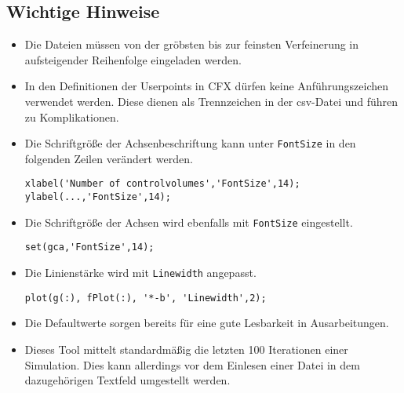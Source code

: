 \subsection{Wichtige Hinweise}
\lstset{language=Matlab}
\begin{itemize}
\item Die Dateien müssen von der gröbsten bis zur feinsten Verfeinerung in aufsteigender Reihenfolge eingeladen werden.
\item In den Definitionen der Userpoints in CFX dürfen keine Anführungszeichen verwendet werden. Diese dienen als Trennzeichen in der csv-Datei und führen zu Komplikationen.
\item Die Schriftgröße der Achsenbeschriftung kann unter \texttt{FontSize} in den folgenden Zeilen verändert werden.
\begin{lstlisting}[frame=single]
xlabel('Number of controlvolumes','FontSize',14);
ylabel(...,'FontSize',14);
\end{lstlisting}
\item Die Schriftgröße der Achsen wird ebenfalls mit \texttt{FontSize} eingestellt.
\begin{lstlisting}[frame=single]
set(gca,'FontSize',14);
\end{lstlisting}
\item Die Linienstärke wird  mit \texttt{Linewidth} angepasst.
\begin{lstlisting}[frame=single]
plot(g(:), fPlot(:), '*-b', 'Linewidth',2);
\end{lstlisting}
\item Die Defaultwerte sorgen bereits für eine gute Lesbarkeit in Ausarbeitungen.
\item Dieses Tool mittelt standardmäßig die letzten 100 Iterationen einer Simulation. Dies kann allerdings vor dem Einlesen einer Datei in dem dazugehörigen Textfeld umgestellt werden. 
\end{itemize}

